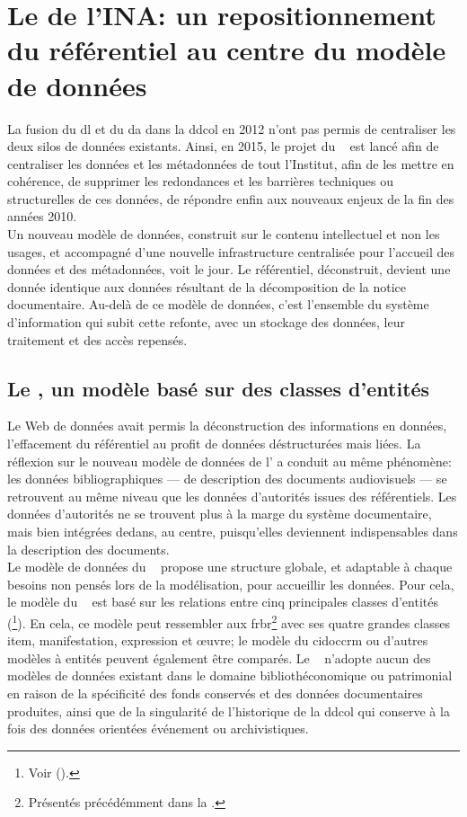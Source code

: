 \section{\label{III-B-2}Le \ldd de l'INA: un repositionnement du référentiel au centre du modèle de données}

La fusion du \ac{dl} et du \ac{da} dans la \ac{ddcol} en 2012 n'ont pas permis de centraliser les deux silos de données existants. Ainsi, en 2015, le projet du \ldd~ est lancé afin de centraliser les données et les métadonnées de tout l'Institut, afin de les mettre en cohérence, de supprimer les redondances et les barrières techniques ou structurelles de ces données, de répondre enfin aux nouveaux enjeux de la fin des années 2010.\\

Un nouveau modèle de données, construit sur le contenu intellectuel et non les usages, et accompagné d'une nouvelle infrastructure centralisée pour l'accueil des données et des métadonnées, voit le jour. Le référentiel, déconstruit, devient une donnée identique aux données résultant de la décomposition de la notice documentaire. Au-delà de ce modèle de données, c'est l'ensemble du système d'information qui subit cette refonte, avec un stockage des données, leur traitement et des accès repensés.

\subsection{\label{III-B-2-a}Le \ldd, un modèle basé sur des classes d'entités}

Le Web de données avait permis la déconstruction des informations en données, l'effacement du référentiel au profit de données déstructurées mais liées. La réflexion sur le nouveau modèle de données de l' a conduit au même phénomène: les données bibliographiques --- de description des documents audiovisuels --- se retrouvent au même niveau que les données d'autorités issues des référentiels. Les données d'autorités ne se trouvent plus à la marge du système documentaire, mais bien intégrées dedans, au centre, puisqu'elles deviennent indispensables dans la description des documents.\\

Le modèle de données du \ldd~ propose une structure globale, et adaptable à chaque besoins non pensés lors de la modélisation, pour accueillir les données. Pour cela, le modèle du \ldd~ est basé sur les relations entre cinq principales classes d'entités (\footnote{Voir  ().}). En cela, ce modèle peut ressembler aux \ac{frbr}\footnote{Présentés précédémment dans la .} avec ses quatre grandes classes item, manifestation, expression et œuvre; le modèle du \ac{cidoccrm} ou d'autres modèles à entités peuvent également être comparés. Le \ldd~ n'adopte aucun des modèles de données existant dans le domaine bibliothéconomique ou patrimonial en raison de la spécificité des fonds conservés et des données documentaires produites, ainsi que de la singularité de l'historique de la \ac{ddcol} qui conserve à la fois des données orientées événement ou archivistiques.


